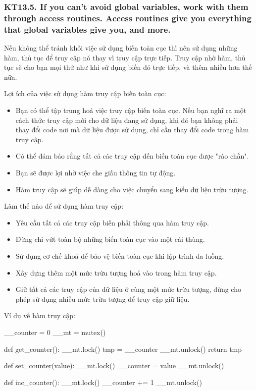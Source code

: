\documentclass[12pt]{report}
\begin{document}
\subsubsection{KT13.5. If you can't avoid global variables, work with them through access routines. Access routines give you everything that global variables give you, and more.}
Nếu không thể tránh khỏi việc sử dụng biến toàn cục thì nên sử dụng những hàm, thủ tục để truy cập nó thay vì truy cập trực tiếp. 
Truy cập nhờ hàm, thủ tục sẽ cho bạn mọi thứ như khi sử dụng biến đó trực tiếp, và thêm nhiều hơn thế nữa. 
\vspace*{5mm}

\noindent Lợi ích của việc sử dụng hàm truy cập biến toàn cục: 
\begin{itemize}
	\item Bạn có thể tập trung hoá việc truy cập biến toàn cục. Nếu bạn nghĩ ra một cách thức truy cập mới cho dữ liệu đang sử dụng, khi đó bạn không phải thay đổi code nơi mà dữ liệu được sử dụng, chỉ cần thay đổi code trong hàm truy cập. 
	\item Có thể đảm bảo rằng tất cả các truy cập đến biến toàn cục được "rào chắn".
	\item Bạn sẽ được lợi nhờ việc che giấu thông tin tự động. 
	\item Hàm truy cập sẽ giúp dễ dàng cho việc chuyển sang kiểu dữ liệu trừu tượng. 
\end{itemize}

\noindent Làm thế nào để sử dụng hàm truy cập:
\begin{itemize}
	\item Yêu cầu tất cả các truy cập biến phải thông qua hàm truy cập.
	\item Đừng chỉ vứt toàn bộ những biến toàn cục vào một cái thùng. 
	\item Sử dụng cơ chế khoá để bảo vệ biến toàn cục khi lập trình đa luồng. 
	\item Xây dựng thêm một mức trừu tượng hoá vào trong hàm truy cập. 
	\item Giữ tất cả các truy cập của dữ liệu ở cùng một mức trừu tượng, đừng cho phép sử dụng nhiều mức trừu tượng để truy cập giữ liệu. 
\end{itemize}
Ví dụ về hàm truy cập:
\begin{python}
__counter = 0
__mt = mutex()

def get_counter():
	__mt.lock()
	tmp = __counter
	__mt.unlock()
	return tmp

def set_counter(value):
	__mt.lock()
	__counter = value
	__mt.unlock()
	
def inc_counter():
	__mt.lock()
	__counter += 1
	__mt.unlock()

\end{python}
\end{document}
